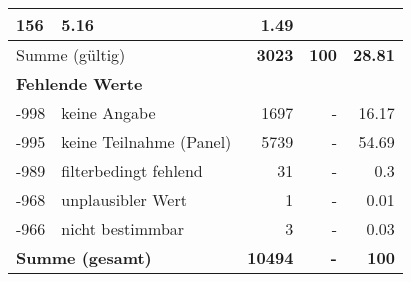 \begin{longtable}{lXrrr}
       \num{156} &
       \num[round-mode=places,round-precision=2]{5,16} &
         \num[round-mode=places,round-precision=2]{1,49} \\
     \midrule
     \multicolumn{2}{l}{Summe (gültig)} &
       \textbf{\num{3023}} &
     \textbf{100} &
       \textbf{\num[round-mode=places,round-precision=2]{28,81}} \\
     \multicolumn{5}{l}{\textbf{Fehlende Werte}}\\
       -998 &
       keine Angabe &
         \num{1697} &
        - &
         \num[round-mode=places,round-precision=2]{16,17} \\
       -995 &
       keine Teilnahme (Panel) &
         \num{5739} &
        - &
         \num[round-mode=places,round-precision=2]{54,69} \\
       -989 &
       filterbedingt fehlend &
         \num{31} &
        - &
         \num[round-mode=places,round-precision=2]{0,3} \\
       -968 &
       unplausibler Wert &
         \num{1} &
        - &
         \num[round-mode=places,round-precision=2]{0,01} \\
       -966 &
       nicht bestimmbar &
         \num{3} &
        - &
         \num[round-mode=places,round-precision=2]{0,03} \\
     \midrule
     \multicolumn{2}{l}{\textbf{Summe (gesamt)}} &
          \textbf{\num{10494}} &
        \textbf{-} &
        \textbf{100} \\
     \bottomrule
     \end{longtable}
     
